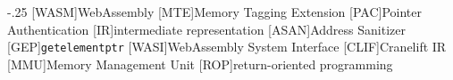 \documentclass[headsepline,footsepline,footinclude=false,oneside,fontsize=11pt,paper=a4,listof=totoc,bibliography=totoc]{scrbook}
\begin{document}


\frontmatter{}





\tableofcontents{}

\mainmatter{}











\appendix{}


\begin{acronym}
	\itemsep-.25\baselineskip
	[WASM]{WebAssembly}
	[MTE]{Memory Tagging Extension}
	[PAC]{Pointer Authentication}
	[IR]{intermediate representation}
	[ASAN]{Address Sanitizer}
	[GEP]{\texttt{getelementptr}}
	[WASI]{WebAssembly System Interface}
	[CLIF]{Cranelift IR}
	[MMU]{Memory Management Unit}
	[ROP]{return-oriented programming}
\end{acronym}

\listoffigures{}
\listoftables{}
\printbibliography{}
\end{document}
